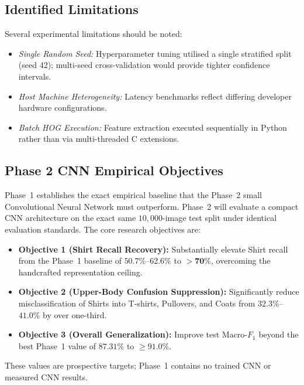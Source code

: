 \documentclass[conference]{IEEEtran}
\begin{document}
\subsection{Identified Limitations}
Several experimental limitations should be noted:
\begin{itemize}
  \item \emph{Single Random Seed:} Hyperparameter tuning utilised a single
    stratified split (seed 42); multi-seed cross-validation would provide
    tighter confidence intervals.
  \item \emph{Host Machine Heterogeneity:} Latency benchmarks reflect
    differing developer hardware configurations.
  \item \emph{Batch HOG Execution:} Feature extraction executed
    sequentially in Python rather than via multi-threaded C extensions.
\end{itemize}

\subsection{Phase 2 CNN Empirical Objectives}
Phase~1 establishes the exact empirical baseline that the Phase~2 small
Convolutional Neural Network must outperform. Phase~2 will evaluate a
compact CNN architecture on the exact same $10{,}000$-image test split
under identical evaluation standards. The core research objectives
are:
\begin{itemize}
  \item \textbf{Objective 1 (Shirt Recall Recovery):} Substantially elevate Shirt recall from the
    Phase~1 baseline of $50.7\%$--$62.6\%$ to $\mathbf{> 70\%}$, overcoming the handcrafted representation ceiling.
  \item \textbf{Objective 2 (Upper-Body Confusion Suppression):} Significantly reduce misclassification
    of Shirts into T-shirts, Pullovers, and Coats from $32.3\%$--$41.0\%$
    by over one-third.
  \item \textbf{Objective 3 (Overall Generalization):} Improve test Macro-$F_1$
    beyond the best Phase~1 value of $87.31\%$ to $\mathbf{\ge 91.0\%}$.
\end{itemize}
These values are prospective targets; Phase~1 contains no trained CNN
or measured CNN results.
\end{document}
